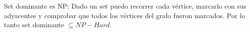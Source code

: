 \documentclass[../tp3_grupo404.tex]{subfiles}
\begin{document}
Set dominante es NP: Dado un set puedo recorrer cada vértice, marcarlo con sus adyacentes
y comprobar que todos los vértices del grafo fueron marcados. Por lo tanto set dominante
$\subseteq NP-Hard$.

\end{document}
